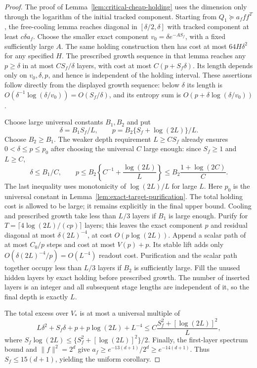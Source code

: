 \begin{proof}
The proof of Lemma~\ref{lem:critical-cheap-holding} uses the dimension
only through the logarithm of the initial tracked component. Starting
from $Q_1\succeq a_f ff^T$, the free-cooling lemma reaches diagonal
in $[\delta/2,\delta]$ with tracked component at least
$c\delta a_f$. Choose the smaller exact component
$v_0=\delta e^{-A S_f}$, with a fixed sufficiently large $A$.
The same holding construction then has cost at most $64H\delta^2$
for any specified $H$. The prescribed growth sequence in that lemma
reaches any $p\ge\delta$ in at most $CS_f/\delta$ layers, with
cost at most $C(p+S_f\delta)$. Its length depends only on
$v_0,\delta,p$, and hence is independent of the holding interval.
These assertions follow directly from the displayed growth sequence:
below $\delta$ its length is
$O(\delta^{-1}\log(\delta/v_0))=O(S_f/\delta)$,
and its entropy sum is $O(p+\delta\log(\delta/v_0))$.

Choose large universal constants $B_1,B_2$ and put
\[
 \delta=B_1S_f/L,\qquad
 p=B_2\{S_f+\log(2L)\}/L.
\]
Choose $B_2\ge B_1$. The weaker depth requirement $L\ge CS_f$
already ensures $0<\delta\le p\le p_0$ after choosing the universal
$C$ large enough: since $S_f\ge1$ and $L\ge C$,
\[
 \delta\le B_1/C,\qquad
 p\le B_2\left\{C^{-1}+\frac{\log(2L)}L\right\}
   \le B_2\frac{1+\log(2C)}C.
\]
The last inequality uses monotonicity of $\log(2L)/L$ for large $L$.
Here $p_0$ is the universal constant in
Lemma~\ref{lem:exact-target-purification}. The total holding cost is
allowed to be large; it remains explicitly in the final upper bound.
Cooling and prescribed growth take less than $L/3$ layers if $B_1$
is large enough. Purify for
$T=\lceil4\log(2L)/(cp)\rceil$ layers; this leaves the exact component
$p$ and residual diagonal at most $\delta(2L)^{-4}$, at cost
$O(p\log(2L))$. Append a scalar path of at most $C_0/p$ steps and
cost at most $V(p)+p$. Its stable lift adds only
$O(\delta(2L)^{-4}/p)=O(L^{-4})$ readout cost.
Purification and the scalar path together occupy less than $L/3$
layers if $B_2$ is sufficiently large. Fill the unused hidden layers
by exact holding before prescribed growth. The number of inserted
layers is an integer and all subsequent stage lengths are independent
of it, so the final depth is exactly $L$.

The total excess over $V_*$ is at most a universal multiple of
\[
 L\delta^2+S_f\delta+p+p\log(2L)+L^{-4}
 \le C\frac{S_f^2+[\log(2L)]^2}{L},
\]
where $S_f\log(2L)\le\{S_f^2+[\log(2L)]^2\}/2$.
Finally, the first-layer spectrum bound and $\|f\|^2=2^d$ give
$a_f\ge e^{-13(d+1)}/2^d\ge e^{-14(d+1)}$.
Thus $S_f\le15(d+1)$, yielding the uniform corollary.
\end{proof}

